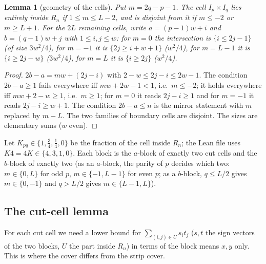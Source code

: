 \documentclass[11pt]{amsart}
\newtheorem{lemma}[theorem]{Lemma}
\theoremstyle{remark}
\begin{document}
\begin{lemma}[geometry of the cells]\label{lem:cells}
Put $m=2q-p-1$. The cell $I_p\times I_q$ lies entirely inside $R_n$ if $1\le m\le L-2$, and is disjoint from it if $m\le-2$ or $m\ge L+1$. For the $2L$ remaining cells,
write $a=(p-1)w+i$ and $b=(q-1)w+j$ with $1\le i,j\le w$: for $m=0$ the intersection is $\{i\le2j-1\}$ (of size $3w^2/4$), for $m=-1$ it is $\{2j\ge i+w+1\}$ ($w^2/4$), for $m=L-1$ it is $\{i\ge2j-w\}$ ($3w^2/4$), for $m=L$ it is $\{i\ge2j\}$ ($w^2/4$).
\end{lemma}
\begin{proof}
$2b-a=mw+(2j-i)$ with $2-w\le2j-i\le2w-1$. The condition $2b-a\ge1$ fails everywhere iff $mw+2w-1<1$, i.e.\ $m\le-2$; it holds everywhere iff $mw+2-w\ge1$, i.e.\ $m\ge1$; for $m=0$ it reads
$2j-i\ge1$ and for $m=-1$ it reads $2j-i\ge w+1$. The condition $2b-a\le n$ is the mirror statement with $m$ replaced by $m-L$. The two families of boundary cells are disjoint. The sizes are elementary sums ($w$ even).
\end{proof}
Let $K_{pq}\in\{1,\tfrac34,\tfrac14,0\}$ be the fraction of the cell inside $R_n$; the Lean file uses $K4=4K\in\{4,3,1,0\}$. Each block is the $a$-block of exactly two cut cells and the $b$-block of exactly two (as an $a$-block, the parity of $p$ decides which two: $m\in\{0,L\}$ for odd $p$, $m\in\{-1,L-1\}$ for even $p$; as a $b$-block, $q\le L/2$ gives $m\in\{0,-1\}$ and $q>L/2$ gives $m\in\{L-1,L\}$).

\subsection{The cut-cell lemma}
For each cut cell we need a lower bound for $\sum_{(i,j)\in U}s_it_j$ ($s,t$ the sign vectors of the two blocks, $U$ the part inside $R_n$) in terms of the block means $x,y$ only. This is where the cover differs from the strip cover.
\end{document}
